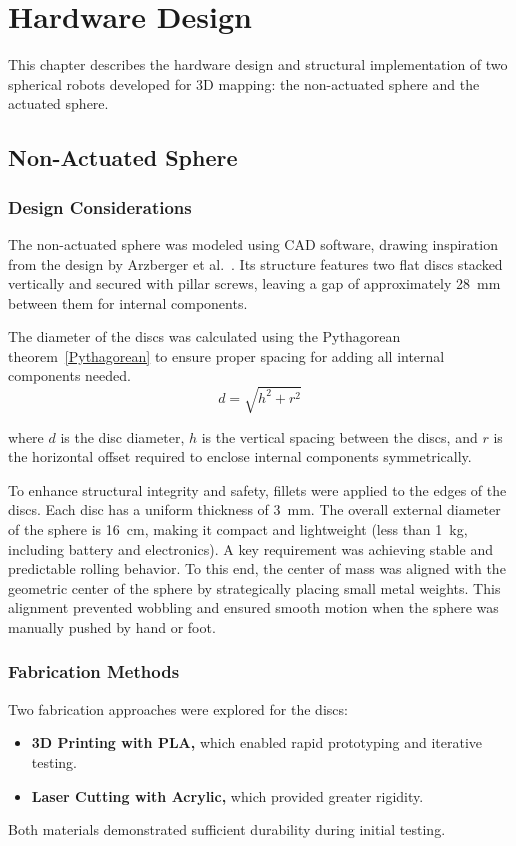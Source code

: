 \documentclass[english, bachelor, utf8]{base/thesis_telematics}
\begin{document}
\chapter{Hardware Design}
\label{sec:hardwaredesign}

This chapter describes the hardware design and structural implementation of two spherical robots developed for 3D mapping: the non-actuated sphere and the actuated sphere.

\section{Non-Actuated Sphere}
\subsection{Design Considerations}

The non-actuated sphere was modeled using CAD software, drawing inspiration from the design by Arzberger et al.~\cite{Kalman_filter_sphere}.
Its structure features two flat discs stacked vertically and secured with pillar screws, leaving a gap of approximately \SI{28}{\milli\meter} between them for internal components. 

The diameter of the discs was calculated using the Pythagorean theorem~\ref{Pythagorean} to ensure proper spacing for adding all internal components needed.
\begin{equation}
    d = \sqrt{h^2 + r^2} \label{Pythagorean}
\end{equation}


\noindent
where $d$ is the disc diameter, $h$ is the vertical spacing between the discs, and $r$ is the horizontal offset required to enclose internal components symmetrically.

To enhance structural integrity and safety, fillets were applied to the edges of the discs. 
Each disc has a uniform thickness of \SI{3}{\milli\meter}.
The overall external diameter of the sphere is \SI{16}{\centi\meter}, making it compact and lightweight (less than \SI{1}{\kilo\gram}, including battery and electronics).
A key requirement was achieving stable and predictable rolling behavior. 
To this end, the center of mass was aligned with the geometric center of the sphere by strategically placing small metal weights. 
This alignment prevented wobbling and ensured smooth motion when the sphere was manually pushed by hand or foot.

\subsection{Fabrication Methods}
Two fabrication approaches were explored for the discs:
\begin{itemize}
    \item \textbf{3D Printing with PLA,} which enabled rapid prototyping and iterative testing.
    \item \textbf{Laser Cutting with Acrylic,} which provided greater rigidity.
\end{itemize}
Both materials demonstrated sufficient durability during initial testing.
\end{document}
